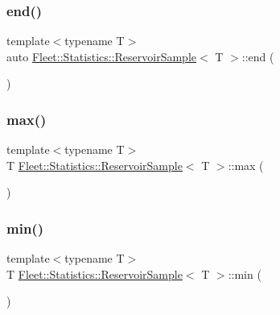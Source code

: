 \subsubsection{\texorpdfstring{end()}{end()}}
{\footnotesize\ttfamily template$<$typename T$>$ \\
auto \hyperlink{class_fleet_1_1_statistics_1_1_reservoir_sample}{Fleet\+::\+Statistics\+::\+Reservoir\+Sample}$<$ T $>$\+::end (\begin{DoxyParamCaption}{ }\end{DoxyParamCaption})\hspace{0.3cm}{\ttfamily [inline]}}

\mbox{\label{class_fleet_1_1_statistics_1_1_reservoir_sample_af2d03d8d0e93ddedc61a43d1827ae48d}} 
\subsubsection{\texorpdfstring{max()}{max()}}
{\footnotesize\ttfamily template$<$typename T$>$ \\
T \hyperlink{class_fleet_1_1_statistics_1_1_reservoir_sample}{Fleet\+::\+Statistics\+::\+Reservoir\+Sample}$<$ T $>$\+::max (\begin{DoxyParamCaption}{ }\end{DoxyParamCaption})\hspace{0.3cm}{\ttfamily [inline]}}

\mbox{\label{class_fleet_1_1_statistics_1_1_reservoir_sample_ab2f186b828351e164e1ed6e60c8c9be8}} 
\subsubsection{\texorpdfstring{min()}{min()}}
{\footnotesize\ttfamily template$<$typename T$>$ \\
T \hyperlink{class_fleet_1_1_statistics_1_1_reservoir_sample}{Fleet\+::\+Statistics\+::\+Reservoir\+Sample}$<$ T $>$\+::min (\begin{DoxyParamCaption}{ }\end{DoxyParamCaption})\hspace{0.3cm}{\ttfamily [inline]}}


